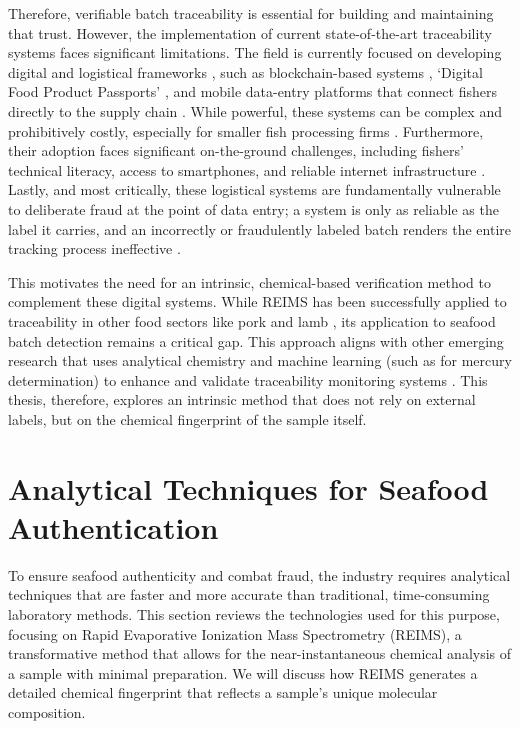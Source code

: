 Therefore, verifiable batch traceability is essential for building and maintaining that trust. However, the implementation of current state-of-the-art traceability systems faces significant limitations. The field is currently focused on developing digital and logistical frameworks \citep{Gastaldi2025}, such as blockchain-based systems \citep{dahariya2025enhancing}, `Digital Food Product Passports' \citep{jiang2025traceability}, and mobile data-entry platforms that connect fishers directly to the supply chain \citep{turkson2025digital, Untal2025}. While powerful, these systems can be complex and prohibitively costly, especially for smaller fish processing firms \citep{Thompson2005}. Furthermore, their adoption faces significant on-the-ground challenges, including fishers' technical literacy, access to smartphones, and reliable internet infrastructure \citep{Untal2025}. Lastly, and most critically, these logistical systems are fundamentally vulnerable to deliberate fraud at the point of data entry; a system is only as reliable as the label it carries, and an incorrectly or fraudulently labeled batch renders the entire tracking process ineffective \citep{Helyar2014}.

This motivates the need for an intrinsic, chemical-based verification method to complement these digital systems. While REIMS has been successfully applied to traceability in other food sectors like pork and lamb \citep{Gkarane2025, Gao2025}, its application to seafood batch detection remains a critical gap. This approach aligns with other emerging research that uses analytical chemistry and machine learning (such as for mercury determination) to enhance and validate traceability monitoring systems \citep{Piroutkova2025}. This thesis, therefore, explores an intrinsic method that does not rely on external labels, but on the chemical fingerprint of the sample itself.

\section{Analytical Techniques for Seafood Authentication}

To ensure seafood authenticity and combat fraud, the industry requires analytical techniques that are faster and more accurate than traditional, time-consuming laboratory methods. This section reviews the technologies used for this purpose, focusing on Rapid Evaporative Ionization Mass Spectrometry (REIMS), a transformative method that allows for the near-instantaneous chemical analysis of a sample with minimal preparation. We will discuss how REIMS generates a detailed chemical fingerprint that reflects a sample's unique molecular composition.


